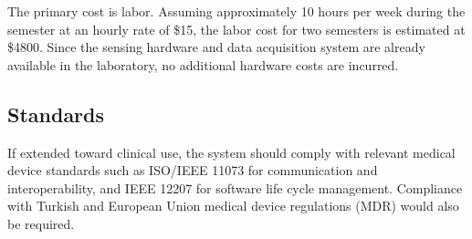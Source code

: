 The primary cost is labor. Assuming approximately 10 hours per week during the semester at an hourly rate of \$15, the labor cost for two semesters is estimated at \$4800. Since the sensing hardware and data acquisition system are already available in the laboratory, no additional hardware costs are incurred.

\subsection{Standards}

If extended toward clinical use, the system should comply with relevant medical device standards such as ISO/IEEE 11073 for communication and interoperability, and IEEE 12207 for software life cycle management. Compliance with Turkish and European Union medical device regulations (MDR) would also be required.

